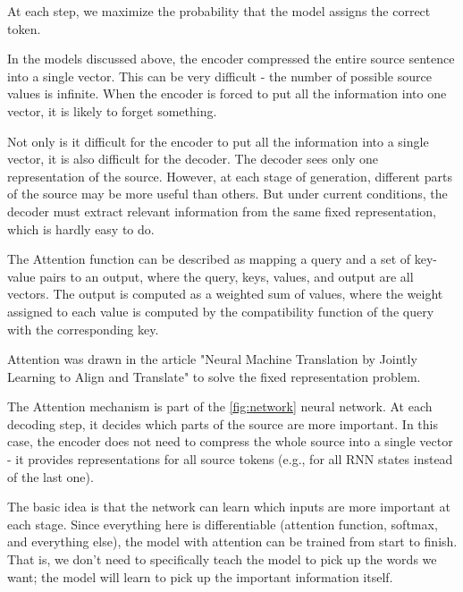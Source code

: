 \documentclass{article}
\begin{document}
At each step, we maximize the probability that the model assigns the correct token.

In the models discussed above, the encoder compressed the entire source sentence into a single vector. This can be very difficult - the number of possible source values is infinite. When the encoder is forced to put all the information into one vector, it is likely to forget something.

Not only is it difficult for the encoder to put all the information into a single vector, it is also difficult for the decoder. The decoder sees only one representation of the source. However, at each stage of generation, different parts of the source may be more useful than others. But under current conditions, the decoder must extract relevant information from the same fixed representation, which is hardly easy to do.

The Attention function can be described as mapping a query and a set of key-value pairs to an output, where the query, keys, values, and output are all vectors. The output is computed as a weighted sum of values, where the weight assigned to each value is computed by the compatibility function of the query with the corresponding key.

Attention was drawn in the article "Neural Machine Translation by Jointly Learning to Align and Translate" \cite{article_3} to solve the fixed representation problem.

The Attention mechanism is part of the \ref{fig:network} neural network. At each decoding step, it decides which parts of the source are more important. In this case, the encoder does not need to compress the whole source into a single vector - it provides representations for all source tokens (e.g., for all RNN states instead of the last one).

The basic idea is that the network can learn which inputs are more important at each stage. Since everything here is differentiable (attention function, softmax, and everything else), the model with attention can be trained from start to finish. That is, we don't need to specifically teach the model to pick up the words we want; the model will learn to pick up the important information itself.
\end{document}

